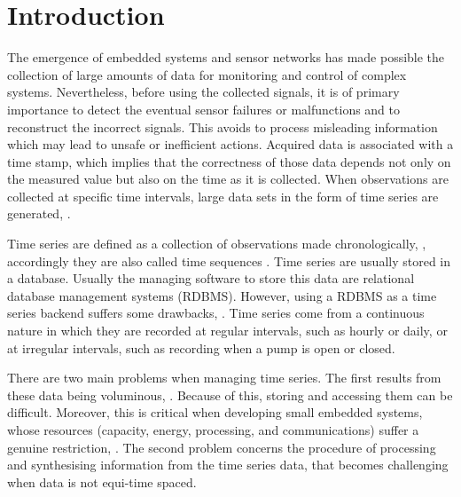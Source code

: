 \section{Introduction}


The emergence of embedded systems and sensor networks has made
possible the collection of large amounts of data for monitoring and
control of complex systems.
%
Nevertheless, before using the collected signals, it is of primary
importance to detect the eventual sensor failures or malfunctions and
to reconstruct the incorrect signals. This avoids to process
misleading information which may lead to unsafe or inefficient
actions. Acquired data is associated with a time stamp, which implies
that the correctness of those data depends not only on the measured
value but also on the time as it is collected. When observations are
collected at specific time intervals, large data sets in the form of
time series are generated, \cite{basu07:_autom}.

Time series are defined as a collection of observations made
chronologically, \cite{fu11}, accordingly they are also called time
sequences \cite{last:hetland}.  Time series are usually stored in a
database. Usually the managing software to store this data are
relational database management systems (RDBMS). However, using a RDBMS
as a time series backend suffers some drawbacks,
\cite{dreyer94,schmidt95,stonebraker09:scidb,zhang11}. Time series
come from a continuous nature in which they are recorded at regular
intervals, such as hourly or daily, or at irregular intervals, such as
recording when a pump is open or closed.

There are two main problems when managing time series. The first
results from these data being voluminous, \cite{fu11}. Because of
this, storing and accessing them can be difficult. Moreover, this is
critical when developing small embedded systems, whose resources
(capacity, energy, processing, and communications) suffer a genuine
restriction, \cite{yaogehrke02}.  The second problem concerns the
procedure of processing and synthesising information from the time
series data, that becomes challenging when data is not equi-time
spaced.



